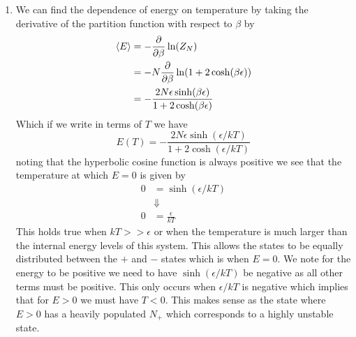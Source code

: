 \documentclass[11pt]{article}
\numberwithin{equation}{section}
\begin{document}
\begin{enumerate}[(1)]
\item We can find the dependence of energy on temperature by taking the derivative of the
partition function with respect to $\beta$ by
\begin{align*}
\left\langle{E}\right\rangle &= -\frac{\partial{}}{\partial{\beta}}\ln(Z_N)\\
&= -N\frac{\partial{}}{\partial{\beta}}\ln(1+2\cosh(\beta\epsilon))\\
&= -\frac{2N\epsilon\sinh(\beta\epsilon)}{1+2\cosh(\beta\epsilon)}\\
\end{align*}
Which if we write in terms of $T$ we have
$$E(T) = -\frac{2N\epsilon\sinh(\epsilon/kT)}{1+2\cosh(\epsilon/kT)}$$
noting that the hyperbolic cosine function is always positive we see that the temperature at
which $E=0$ is given by
\begin{align*}
0 &= \sinh(\epsilon/kT)\\
&\Downarrow\\
0 &= \frac{\epsilon}{kT}
\end{align*}
This holds true when $kT>>\epsilon$ or when the temperature is much larger than the internal
energy levels of this system. This allows the states to be equally distributed between the 
$+$ and $-$ states which is when $E=0$. We note for the energy to be positive we need to have
$\sinh(\epsilon/kT)$ be negative as all other terms must be positive. This only occurs when
$\epsilon/kT$ is negative which implies that for $E>0$ we must have $T<0$. This makes sense 
as the state where $E>0$ has a heavily populated $N_+$ which corresponds to a highly unstable
state.


\end{enumerate}
\end{document}
